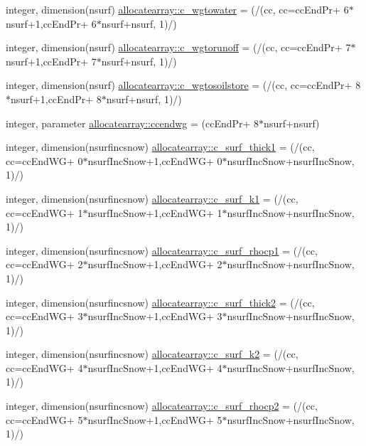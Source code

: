 \begin{DoxyCompactItemize}
\item 
integer, dimension(nsurf) \hyperlink{namespaceallocatearray_a6cd7170de2066ae2e7f5a86d11d95c78}{allocatearray\+::c\+\_\+wgtowater} = (/(cc, cc=cc\+End\+Pr+ 6$\ast$nsurf+1,cc\+End\+Pr+ 6$\ast$nsurf+nsurf, 1)/)
\item 
integer, dimension(nsurf) \hyperlink{namespaceallocatearray_a2288eb0b49a484223ef14c79fd697a6a}{allocatearray\+::c\+\_\+wgtorunoff} = (/(cc, cc=cc\+End\+Pr+ 7$\ast$nsurf+1,cc\+End\+Pr+ 7$\ast$nsurf+nsurf, 1)/)
\item 
integer, dimension(nsurf) \hyperlink{namespaceallocatearray_a758dfb9cf7decebcf5cebad33671966a}{allocatearray\+::c\+\_\+wgtosoilstore} = (/(cc, cc=cc\+End\+Pr+ 8$\ast$nsurf+1,cc\+End\+Pr+ 8$\ast$nsurf+nsurf, 1)/)
\item 
integer, parameter \hyperlink{namespaceallocatearray_a8a78b81f97b58eabdf3093c545cbd9f5}{allocatearray\+::ccendwg} = (cc\+End\+Pr+ 8$\ast$nsurf+nsurf)
\item 
integer, dimension(nsurfincsnow) \hyperlink{namespaceallocatearray_a866c8ff557fab63314fe0c293b2d1782}{allocatearray\+::c\+\_\+surf\+\_\+thick1} = (/(cc, cc=cc\+End\+WG+ 0$\ast$nsurf\+Inc\+Snow+1,cc\+End\+WG+ 0$\ast$nsurf\+Inc\+Snow+nsurf\+Inc\+Snow, 1)/)
\item 
integer, dimension(nsurfincsnow) \hyperlink{namespaceallocatearray_a19301e431885ac6ef6524c2bf4e0829c}{allocatearray\+::c\+\_\+surf\+\_\+k1} = (/(cc, cc=cc\+End\+WG+ 1$\ast$nsurf\+Inc\+Snow+1,cc\+End\+WG+ 1$\ast$nsurf\+Inc\+Snow+nsurf\+Inc\+Snow, 1)/)
\item 
integer, dimension(nsurfincsnow) \hyperlink{namespaceallocatearray_addb0a760e3ebe1883e253698960a3075}{allocatearray\+::c\+\_\+surf\+\_\+rhocp1} = (/(cc, cc=cc\+End\+WG+ 2$\ast$nsurf\+Inc\+Snow+1,cc\+End\+WG+ 2$\ast$nsurf\+Inc\+Snow+nsurf\+Inc\+Snow, 1)/)
\item 
integer, dimension(nsurfincsnow) \hyperlink{namespaceallocatearray_ab0c34bdf07a4bcc153b9821464d45a3e}{allocatearray\+::c\+\_\+surf\+\_\+thick2} = (/(cc, cc=cc\+End\+WG+ 3$\ast$nsurf\+Inc\+Snow+1,cc\+End\+WG+ 3$\ast$nsurf\+Inc\+Snow+nsurf\+Inc\+Snow, 1)/)
\item 
integer, dimension(nsurfincsnow) \hyperlink{namespaceallocatearray_ac896b61bac1cd4d2eea1332e3c5b18e6}{allocatearray\+::c\+\_\+surf\+\_\+k2} = (/(cc, cc=cc\+End\+WG+ 4$\ast$nsurf\+Inc\+Snow+1,cc\+End\+WG+ 4$\ast$nsurf\+Inc\+Snow+nsurf\+Inc\+Snow, 1)/)
\item 
integer, dimension(nsurfincsnow) \hyperlink{namespaceallocatearray_a11520098b1a1428ee68c6a7a1b292b53}{allocatearray\+::c\+\_\+surf\+\_\+rhocp2} = (/(cc, cc=cc\+End\+WG+ 5$\ast$nsurf\+Inc\+Snow+1,cc\+End\+WG+ 5$\ast$nsurf\+Inc\+Snow+nsurf\+Inc\+Snow, 1)/)

\end{DoxyCompactItemize}
